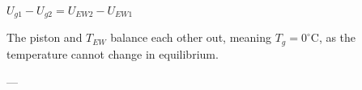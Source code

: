 \( U_{g1} - U_{g2} = U_{EW2} - U_{EW1} \)  

The piston and \( T_{EW} \) balance each other out, meaning \( T_g = 0^\circ \text{C} \), as the temperature cannot change in equilibrium.  

---